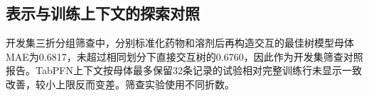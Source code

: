 \subsection{表示与训练上下文的探索对照}
开发集三折分组筛查中，分别标准化药物和溶剂后再构造交互的最佳树模型母体MAE为0.6817，未超过相同划分下直接交互树的0.6760，因此作为开发集筛查对照报告。TabPFN上下文按母体最多保留32条记录的试验相对完整训练行未显示一致改善，较小上限反而变差。筛查实验使用不同折数。
